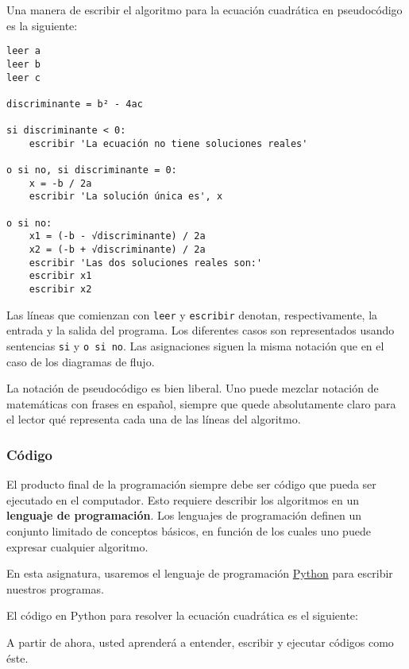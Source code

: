 Una manera de escribir el algoritmo para la ecuación cuadrática en
pseudocódigo es la siguiente:

\begin{lstlisting}
leer a
leer b
leer c

discriminante = b² - 4ac

si discriminante < 0:
    escribir 'La ecuación no tiene soluciones reales'

o si no, si discriminante = 0:
    x = -b / 2a
    escribir 'La solución única es', x

o si no:
    x1 = (-b - √discriminante) / 2a
    x2 = (-b + √discriminante) / 2a
    escribir 'Las dos soluciones reales son:'
    escribir x1
    escribir x2
\end{lstlisting}

Las líneas que comienzan con \lstinline!leer! y \lstinline!escribir!
denotan, respectivamente, la entrada y la salida del programa. Los
diferentes casos son representados usando sentencias \lstinline!si! y
\lstinline!o si no!. Las asignaciones siguen la misma notación que en el
caso de los diagramas de flujo.

La notación de pseudocódigo es bien liberal. Uno puede mezclar notación
de matemáticas con frases en español, siempre que quede absolutamente
claro para el lector qué representa cada una de las líneas del
algoritmo.

\subsubsection{Código}

El producto final de la programación siempre debe ser código que pueda
ser ejecutado en el computador. Esto requiere describir los algoritmos
en un \textbf{lenguaje de programación}. Los lenguajes de programación
definen un conjunto limitado de conceptos básicos, en función de los
cuales uno puede expresar cualquier algoritmo.

En esta asignatura, usaremos el lenguaje de programación
\href{http://python.org/}{Python} para escribir nuestros programas.

El código en Python para resolver la ecuación cuadrática es el
siguiente:

A partir de ahora, usted aprenderá a entender, escribir y ejecutar
códigos como éste.
